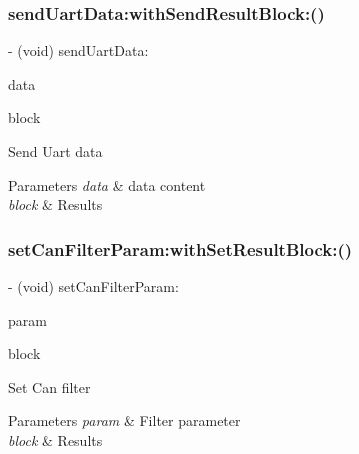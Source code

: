 \subsubsection{\texorpdfstring{send\+Uart\+Data\+:with\+Send\+Result\+Block\+:()}{sendUartData:withSendResultBlock:()}}
{\footnotesize\ttfamily -\/ (void) send\+Uart\+Data\+: \begin{DoxyParamCaption}\item[{(\hyperlink{struct_p_v_s_d_k___m_o_u_n_t_a_p_i___u_a_r_t___d_a_t_a}{P\+V\+S\+D\+K\+\_\+\+M\+O\+U\+N\+T\+A\+P\+I\+\_\+\+U\+A\+R\+T\+\_\+\+D\+A\+TA})}]{data }\item[{withSendResultBlock:(P\+V\+Send\+Data\+Result\+Block)}]{block }\end{DoxyParamCaption}}

Send Uart data


\begin{DoxyParams}{Parameters}
{\em data} & data content \\
\hline
{\em block} & Results \\
\hline
\end{DoxyParams}
\mbox{\label{interface_p_v_mount_ab8227c3a907e87e5b4deb5e2f9151ac0}} 
\subsubsection{\texorpdfstring{set\+Can\+Filter\+Param\+:with\+Set\+Result\+Block\+:()}{setCanFilterParam:withSetResultBlock:()}}
{\footnotesize\ttfamily -\/ (void) set\+Can\+Filter\+Param\+: \begin{DoxyParamCaption}\item[{(\hyperlink{struct_p_v_s_d_k___m_o_u_n_t_a_p_i___c_a_n___f_i_l_t_e_r___p_a_r_a_m}{P\+V\+S\+D\+K\+\_\+\+M\+O\+U\+N\+T\+A\+P\+I\+\_\+\+C\+A\+N\+\_\+\+F\+I\+L\+T\+E\+R\+\_\+\+P\+A\+R\+AM})}]{param }\item[{withSetResultBlock:(P\+V\+Set\+Can\+Filter\+Param\+Result\+Block)}]{block }\end{DoxyParamCaption}}

Set Can filter


\begin{DoxyParams}{Parameters}
{\em param} & Filter parameter \\
\hline
{\em block} & Results \\
\hline
\end{DoxyParams}
\mbox{\label{interface_p_v_mount_a2ab76320ecdec4fd52974349ca6cd6f0}} 
